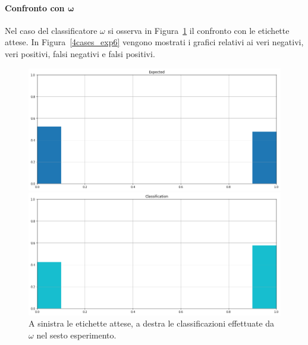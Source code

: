 \documentclass[12pt]{report}
\theoremstyle{definition}
\begin{document}
\paragraph{Confronto con $\bm{\omega}$}
Nel caso del classificatore $\omega$ si osserva in Figura~\ref{classification_exp6} il confronto con le etichette attese. 
In Figura~\ref{4cases_exp6} vengono mostrati i grafici relativi ai veri negativi, veri positivi, falsi negativi e falsi positivi.
\begin{figure}
\centering
    \begin{minipage}{0.48\textwidth}
        \includegraphics[width=\linewidth]{images/experiment_beta05_sovrapposti/expected_classification.png}
    \end{minipage}
    \begin{minipage}{0.48\textwidth}
        \includegraphics[width=\linewidth]{images/experiment_beta05_sovrapposti/prediction_classification.png}
    \end{minipage}
    \caption{A sinistra le etichette attese, a destra le classificazioni effettuate da $\omega$ nel sesto esperimento.}
    \label{classification_exp6}
\end{figure}
\end{document}
